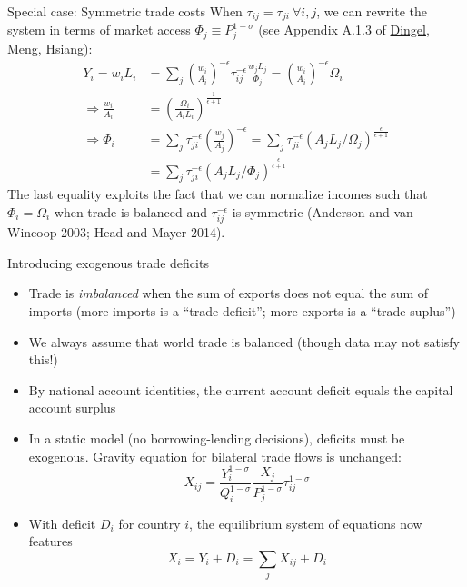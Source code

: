 \documentclass[10pt,notes=hide,aspectratio=169]{beamer}
\begin{document}
\begin{frame}{Special case: Symmetric trade costs}
When $\tau_{ij} = \tau_{ji} \ \forall i,j$,
we can rewrite the system in terms of market access $\Phi_j \equiv P_j^{1-\sigma}$
(see Appendix A.1.3 of \href{http://www.jdingel.com/research/DingelMengHsiang.pdf}{Dingel, Meng, Hsiang}):
\begin{align*}
Y_i = w_i L_i  	&= \sum_j \left(\frac{w_i}{A_i}\right)^{-\epsilon}\tau_{ij}^{-\epsilon} \frac{w_j L_j}{\Phi_j}
			= \left(\frac{w_i}{A_i}\right)^{-\epsilon} \Omega_i \\
\Rightarrow \frac{w_i}{A_i}	&= \left(\frac{\Omega_i}{A_i L_i}\right)^{\frac{1}{\epsilon+1}} \\
\Rightarrow \Phi_i 	&= \sum_j \tau_{ji}^{-\epsilon} \left(\frac{w_j}{A_j}\right)^{-\epsilon} 
					= \sum_j \tau_{ji}^{-\epsilon} \left(A_j L_j / \Omega_j\right)^{\frac{\epsilon}{\epsilon+1}}\\
					&= \sum_j \tau_{ji}^{-\epsilon} \left(A_j L_j / \Phi_j\right)^{\frac{\epsilon}{\epsilon+1}}
\end{align*}
The last equality exploits the fact that 
we can normalize incomes such that $\Phi_i = \Omega_i$
when trade is balanced and $\tau_{ij}^{-\epsilon}$ is symmetric
(Anderson and van Wincoop 2003; Head and Mayer 2014).
\end{frame}
\begin{frame}{Introducing exogenous trade deficits}
\begin{itemize}
\item
Trade is \textit{imbalanced} when the sum of exports does not equal the sum of imports
(more imports is a ``trade deficit''; more exports is a ``trade suplus'')
\item
We always assume that world trade is balanced (though data may not satisfy this!)
\item
By national account identities, the current account deficit equals the capital account surplus
\item
In a static model (no borrowing-lending decisions), deficits must be exogenous.
Gravity equation for bilateral trade flows is unchanged:
\begin{equation*}
X_{ij}	= \frac{Y_i^{1-\sigma}}{Q_i^{1-\sigma}} \frac{X_j}{P_j^{1-\sigma}}\tau_{ij}^{1-\sigma}
\end{equation*}
\item With deficit $D_i$ for country $i$, the equilibrium system of equations now features
\begin{equation*}
X_i = Y_i + D_i = \sum_j X_{ij} + D_i
\end{equation*}
\end{itemize}
\end{frame}
\end{document}
